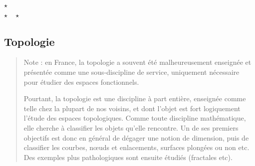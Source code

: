 \documentclass{article}
\def\separateur{\begin{center}
$\star$\\
$\star\quad\star$
\end{center}}
\begin{document}
\separateur
\subsection{Topologie}

\begin{quote}
Note : en France, la topologie a souvent été malheureusement enseignée et présentée comme une sous-discipline de service, uniquement nécessaire pour étudier des espaces fonctionnels.

Pourtant, la topologie est une discipline à part entière, enseignée comme telle chez la plupart de nos voisins, et dont l'objet est fort logiquement l'étude des espaces topologiques. 
Comme toute discipline mathématique, elle cherche à classifier les objets qu'elle rencontre. Un de ses premiers objectifs est donc en général de dégager une notion de dimension, puis de classifier les courbes, n\oe uds et enlacements, surfaces plongées ou non etc. Des exemples plus pathologiques sont ensuite étudiés (fractales etc).
\end{quote}
\end{document}
